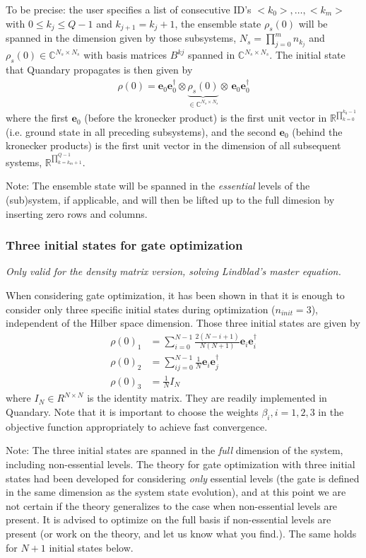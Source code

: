 \documentclass[11pt]{article}
\newcommand{\R}{\mathds{R}}
\newcommand{\C}{\mathds{C}}
\newcommand{\bs}[1]{{\boldsymbol{#1}}}
\begin{document}
To be precise: the user specifies a list of consecutive ID's $<k_0>, \dots, <k_m>$ with $0 \leq k_j \leq Q-1$ and $k_{j+1} = k_j+1$, the ensemble state $\rho_s(0)$ will be spanned in the dimension given by those subsystems, $N_s = \prod_{j=0}^{m} n_{k_j}$ and $\rho_s(0) \in \C^{N_s\times N_s}$ with basis matrices $B^{kj}$ spanned in $\C^{N_s\times N_s}$. The initial state that Quandary propagates is then given by 
\begin{align}
  \rho(0) = \bs{e}_0\bs{e}_0^\dagger \otimes \underbrace{\rho_s(0)}_{\in \C^{N_s\times N_s}} \otimes \, \bs{e}_0 \bs{e}_0^\dagger
\end{align}
where the first $\bs{e}_0$ (before the kronecker product) is the first unit vector in $\R^{\prod_{k=0}^{k_0-1}}$ (i.e. ground state in all preceding subsystems), and the second $\bs{e}_0$ (behind the kronecker products) is the first unit vector in the dimension of all subsequent systems, $\R^{\prod_{k=k_m+1}^{Q-1}}$. 

Note: The ensemble state will be spanned in the \textit{essential} levels of the (sub)system, if applicable, and will then be lifted up to the full dimesion by inserting zero rows and columns. 

\subsubsection{Three initial states for gate optimization}\label{subsec:threeinitcond}
\textit{Only valid for the density matrix version, solving Lindblad's master equation.}

When considering gate optimization, it has been shown in \cite{goerz2014optimal} that it is enough to consider only three specific initial states during optimization ($n_{init}=3$), independent of the Hilber space dimension. Those three initial states are given by
\begin{align}
    \rho(0)_1 &= \sum_{i=0}^{N-1} \frac{2(N-i+1)}{N(N+1)} \bs{e}_i\bs{e}_i^\dagger \\
    \rho(0)_2 &= \sum_{ij=0}^{N-1} \frac{1}{N} \bs{e}_i\bs{e}_j^\dagger\\
    \rho(0)_3 &= \frac{1}{N} I_N
\end{align}
where $I_N\in R^{N\times N}$ is the identity matrix. They are readily implemented in Quandary. Note that it is important to choose the weights $\beta_i, i=1,2,3$ in the objective function appropriately to achieve fast convergence. 

Note: The three initial states are spanned in the \textit{full} dimension of the system, including non-essential levels. The theory for gate optimization with three initial states had been developed for considering \textit{only} essential levels (the gate is defined in the same dimension as the system state evolution), and at this point we are not certain if the theory generalizes to the case when non-essential levels are present. It is advised to optimize on the full basis if non-essential levels are present (or work on the theory, and let us know what you find.). The same holds for $N+1$ initial states below. 
\end{document}

